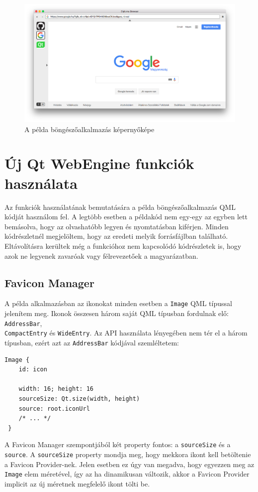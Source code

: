 \documentclass[12pt]{report}
\begin{document}
\begin{figure}[H]
    \centering
    \includegraphics[scale=0.34]{diplomabrowser}
    \caption{
        \label{fig:diplomabrowser}
        A példa böngészőalkalmazás képernyőképe
    }
\end{figure}

\newpage
\section{Új Qt WebEngine funkciók használata}

Az funkciók használatának bemutatására a példa böngészőalkalmazás QML kódját használom fel.
A legtöbb esetben a példakód nem egy-egy az egyben lett bemásolva, hogy az olvashatóbb
legyen és nyomtatásban kiférjen. Minden kódrészletnél megjelöltem, hogy az eredeti
melyik forrásfájlban található. Eltávolításra kerültek még a funkcióhoz nem kapcsolódó
kódrészletek is, hogy azok ne legyenek zavaróak vagy félrevezetőek a magyarázatban.

\subsection{Favicon Manager}

A példa alkalmazásban az ikonokat minden esetben a \texttt{Image} QML típussal jelenítem meg.
Ikonok összesen három saját QML típusban fordulnak elő: \texttt{AddressBar}, \\
\texttt{CompactEntry} és \texttt{WideEntry}. Az API használata lényegében nem tér el a három
típusban, ezért azt az \texttt{AddressBar} kódjával szemléltetem:
\begin{lstlisting}[title=AddressBar.qml]
 Image {
    id: icon

    width: 16; height: 16
    sourceSize: Qt.size(width, height)
    source: root.iconUrl
    /* ... */
 }
\end{lstlisting}
A Favicon Manager szempontjából két property fontos: a \texttt{sourceSize} és a
\texttt{source}. A \texttt{sourceSize} property mondja meg, hogy mekkora ikont kell
betöltenie a Favicon Provider-nek. Jelen esetben ez úgy van megadva, hogy egyezzen meg az
\texttt{Image} elem méretével, így az ha dinamikusan változik, akkor a Favicon Provider
implicit az új méretnek megfelelő ikont tölti be.
\end{document}
